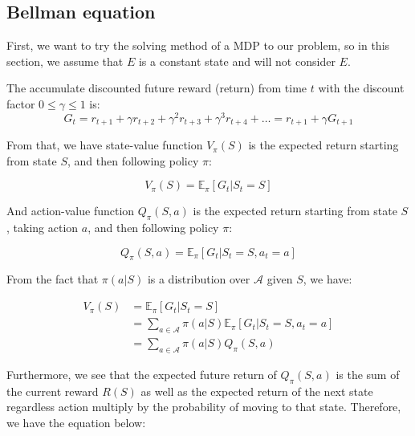 \documentclass[
  a4paper, xcolor = usenames,dvipsnames]{article}
\begin{document}
\hypertarget{bellman-equation}{%
\subsection{Bellman equation}\label{bellman-equation}}

First, we want to try the solving method of a MDP to our problem, so in this section, we assume that \(E\) is a constant state and will not consider \(E\).

The accumulate discounted future reward (return) from time \(t\) with the discount factor \(0 \le \gamma \le 1\) is:
\[
G_{t} = r_{t + 1} + \gamma r_{t + 2} + \gamma^{2} r_{t + 3} + \gamma^{3} r_{t + 4} + \dots = r_{t + 1} + \gamma G_{t + 1}
\]

From that, we have state-value function \(V_{\pi}(S)\) is the expected return starting from state \(S\), and then following policy \(\pi\):

\begin{equation}
V_{\pi}(S) = \mathbb{E}_{\pi}[G_{t} | S_{t} = S]
\label{eq:state-value}
\end{equation}

And action-value function \(Q_{\pi}(S, a)\) is the expected return starting from state \(S\), taking action \(a\), and then following policy \(\pi\):

\begin{equation}
Q_{\pi}(S, a) = \mathbb{E}_{\pi}[G_{t} | S_{t} = S, a_{t} = a]
\label{eq:action-value}
\end{equation}

From the fact that \(\pi(a | S)\) is a distribution over \(\mathcal{A}\) given \(S\), we have:

\begin{equation}
\begin{split}
V_{\pi}(S) {}&= \mathbb{E}_{\pi}[G_{t} | S_{t} = S] \\
  &= \sum_{a \in \mathcal{A}} \pi(a | S) \mathbb{E}_{\pi}[G_{t} | S_{t} = S, a_{t} = a] \\
  &= \sum_{a \in \mathcal{A}} \pi(a | S) Q_{\pi}(S, a)
\label{eq:v-to-q}
\end{split}
\end{equation}

Furthermore, we see that the expected future return of \(Q_{\pi}(S, a)\) is the sum of the current reward \(R(S)\) as well as the expected return of the next state regardless action multiply by the probability of moving to that state. Therefore, we have the equation below:
\end{document}
